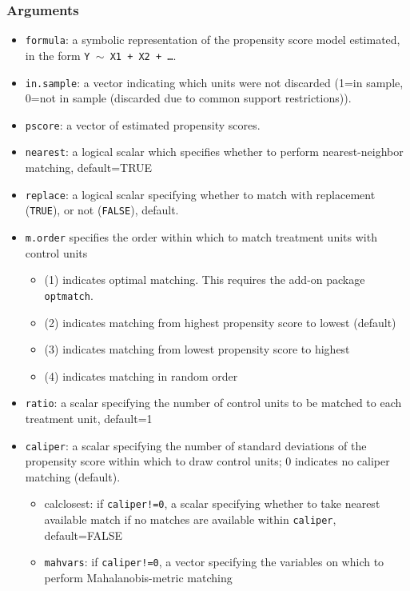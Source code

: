 \documentclass[oneside,letterpaper,titlepage]{article}
\begin{document}
\begin{appendix}
\subsubsection{Arguments}
\begin{itemize}
\item \texttt{formula}: a symbolic representation of the propensity
  score model estimated, in the form {\tt Y $\sim$ X1 + X2 + \dots}.
\item \texttt{in.sample}: a vector indicating which units were not
  discarded (1=in sample, 0=not in sample (discarded due to common
  support restrictions)).
\item \texttt{pscore}: a vector of estimated propensity scores.
\item \texttt{nearest}: a logical scalar which specifies whether to
  perform nearest-neighbor matching, default=TRUE
\item \texttt{replace}: a logical scalar specifying whether to match
  with replacement (\texttt{TRUE}), or not (\texttt{FALSE}), default.
\item \texttt{m.order} specifies the order within which to match
  treatment units with control units
  \begin{itemize}
  \item (1) indicates optimal matching.  This requires the add-on package \texttt{optmatch}.
  \item (2) indicates matching from highest propensity score to lowest
    (default)
  \item (3) indicates matching from lowest propensity score to highest
  \item (4) indicates matching in random order
  \end{itemize}
\item \texttt{ratio}: a scalar specifying the number of control units
  to be matched to each treatment unit, default=1
\item \texttt{caliper}: a scalar specifying the number of standard
  deviations of the propensity score within which to draw control
  units; 0 indicates no caliper matching (default).
  \begin{itemize}
  \item{calclosest}: if \texttt{caliper!=0}, a scalar specifying
    whether to take nearest available match if no matches are
    available within \texttt{caliper}, default=FALSE
  \item\texttt{mahvars}: if \texttt{caliper!=0}, a vector specifying
    the variables on which to perform Mahalanobis-metric matching

\end{itemize}
\end{itemize}
\end{appendix}
\end{document}
